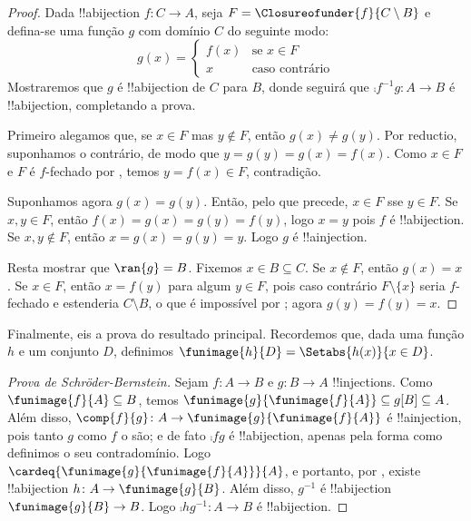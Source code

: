 \documentclass[../../../include/open-logic-section]{subfiles}
\begin{document}
\begin{proof}
Dada !!a{bijection} $f \colon C \to A$, seja $F =
\Closureofunder{f}{C \setminus B}$ e defina-se uma função $g$ com
domínio $C$ do seguinte modo:
\[
	g(x) = 
	\begin{cases}
			f(x) &\text{se $x \in F$}\\
			x & \text{caso contrário}
		\end{cases}
\]
Mostraremos que $g$ é !!a{bijection} de $C$ para $B$, donde seguirá que
$\comp{f^{-1}}{g} \colon A \to B$ é !!a{bijection}, completando a
prova.

Primeiro alegamos que, se $x \in F$ mas $y\notin F$, então $g(x) \neq
g(y)$. Por reductio, suponhamos o contrário, de modo que $y = g(y) = g(x) =
f(x)$. Como $x \in F$ e $F$ é $f$-fechado por ,
temos $y = f(x) \in F$, contradição.

Suponhamos agora $g(x) = g(y)$. Então, pelo que precede, $x \in F$ sse
$y \in F$. Se $x, y \in F$, então $f(x) = g (x) = g(y) = f(y)$, logo
$x = y$ pois $f$ é !!a{bijection}. Se $x, y \notin F$, então $x = g(x) =
g(y) = y$. Logo $g$ é !!a{injection}.

Resta mostrar que $\ran{g} = B$. Fixemos $x \in B \subseteq C$. Se $x
\notin F$, então $g(x) = x$. Se $x \in F$, então $x = f(y)$ para algum
$y \in F$, pois caso contrário $F \setminus \{x\}$ seria $f$-fechado e
estenderia $C\setminus B$, o que é impossível por ;
agora $g(y) = f(y) = x$.
\end{proof}

Finalmente, eis a prova do resultado principal. Recordemos que, dada uma
função $h$ e um conjunto $D$, definimos $\funimage{h}{D} = \Setabs{h(x)}{x
\in D}$.

\begin{proof}[Prova de Schr\"oder-Bernstein] Sejam $f \colon A \to B$
e $g \colon B \to A$ !!{injection}s. Como $\funimage{f}{A}
\subseteq B$, temos $\funimage{g}{\funimage{f}{A}} \subseteq
g[B] \subseteq A$. Além disso, $\comp{f}{g} \colon A \to
\funimage{g}{\funimage{f}{A}}$ é !!a{injection}, pois tanto $g$ como
$f$ o são; e de fato $\comp{f}{g}$ é !!a{bijection}, apenas pela forma
como definimos o seu contradomínio. Logo
$\cardeq{\funimage{g}{\funimage{f}{A}}}{A}$, e portanto, por
, existe !!a{bijection} $h \colon A \to
\funimage{g}{B}$. Além disso, $g^{-1}$ é !!a{bijection}
$\funimage{g}{B} \to B$. Logo $\comp{h}{g^{-1}} \colon A \to B$ é
!!a{bijection}.
\end{proof}
\end{document}
